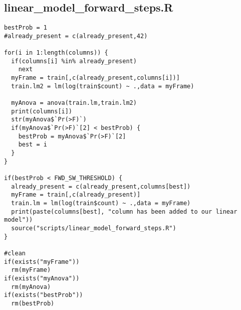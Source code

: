 \subsection{linear\_model\_forward\_steps.R}
\label{sec:script-linear-model-fwd-steps}

\begin{verbatim}
bestProb = 1
#already_present = c(already_present,42)

for(i in 1:length(columns)) {
  if(columns[i] %in% already_present)
    next
  myFrame = train[,c(already_present,columns[i])]
  train.lm2 = lm(log(train$count) ~ .,data = myFrame)
  
  myAnova = anova(train.lm,train.lm2)
  print(columns[i])
  str(myAnova$`Pr(>F)`)
  if(myAnova$`Pr(>F)`[2] < bestProb) {
    bestProb = myAnova$`Pr(>F)`[2]
    best = i
  }
}

if(bestProb < FWD_SW_THRESHOLD) {
  already_present = c(already_present,columns[best])
  myFrame = train[,c(already_present)]
  train.lm = lm(log(train$count) ~ .,data = myFrame)
  print(paste(columns[best], "column has been added to our linear model"))
  source("scripts/linear_model_forward_steps.R")
}

#clean
if(exists("myFrame"))
  rm(myFrame)
if(exists("myAnova"))
  rm(myAnova)
if(exists("bestProb"))
  rm(bestProb)
\end{verbatim}
